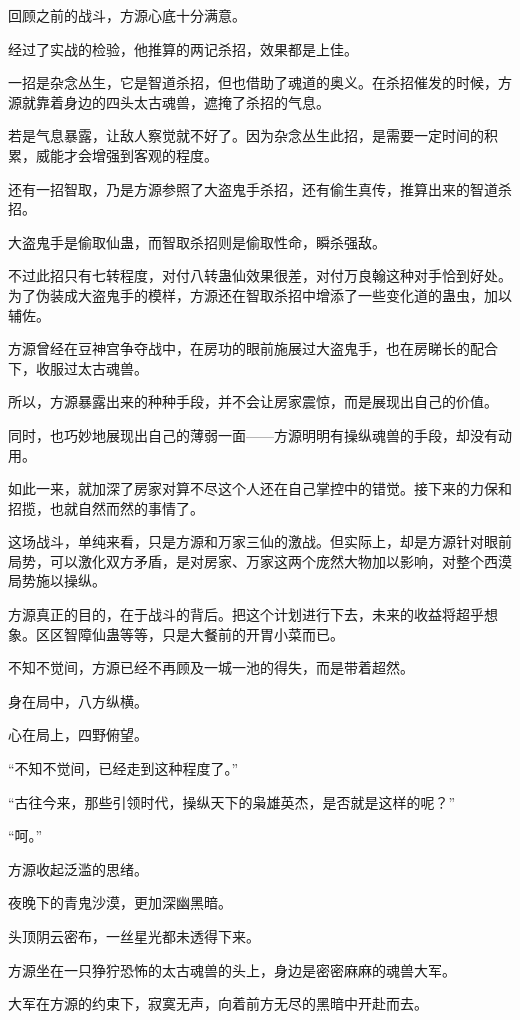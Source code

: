 \begin{this_body}
回顾之前的战斗，方源心底十分满意。

经过了实战的检验，他推算的两记杀招，效果都是上佳。

一招是杂念丛生，它是智道杀招，但也借助了魂道的奥义。在杀招催发的时候，方源就靠着身边的四头太古魂兽，遮掩了杀招的气息。

若是气息暴露，让敌人察觉就不好了。因为杂念丛生此招，是需要一定时间的积累，威能才会增强到客观的程度。

还有一招智取，乃是方源参照了大盗鬼手杀招，还有偷生真传，推算出来的智道杀招。

大盗鬼手是偷取仙蛊，而智取杀招则是偷取性命，瞬杀强敌。

不过此招只有七转程度，对付八转蛊仙效果很差，对付万良翰这种对手恰到好处。为了伪装成大盗鬼手的模样，方源还在智取杀招中增添了一些变化道的蛊虫，加以辅佐。

方源曾经在豆神宫争夺战中，在房功的眼前施展过大盗鬼手，也在房睇长的配合下，收服过太古魂兽。

所以，方源暴露出来的种种手段，并不会让房家震惊，而是展现出自己的价值。

同时，也巧妙地展现出自己的薄弱一面——方源明明有操纵魂兽的手段，却没有动用。

如此一来，就加深了房家对算不尽这个人还在自己掌控中的错觉。接下来的力保和招揽，也就自然而然的事情了。

这场战斗，单纯来看，只是方源和万家三仙的激战。但实际上，却是方源针对眼前局势，可以激化双方矛盾，是对房家、万家这两个庞然大物加以影响，对整个西漠局势施以操纵。

方源真正的目的，在于战斗的背后。把这个计划进行下去，未来的收益将超乎想象。区区智障仙蛊等等，只是大餐前的开胃小菜而已。

不知不觉间，方源已经不再顾及一城一池的得失，而是带着超然。

身在局中，八方纵横。

心在局上，四野俯望。

“不知不觉间，已经走到这种程度了。”

“古往今来，那些引领时代，操纵天下的枭雄英杰，是否就是这样的呢？”

“呵。”

方源收起泛滥的思绪。

夜晚下的青鬼沙漠，更加深幽黑暗。

头顶阴云密布，一丝星光都未透得下来。

方源坐在一只狰狞恐怖的太古魂兽的头上，身边是密密麻麻的魂兽大军。

大军在方源的约束下，寂寞无声，向着前方无尽的黑暗中开赴而去。

\end{this_body}

